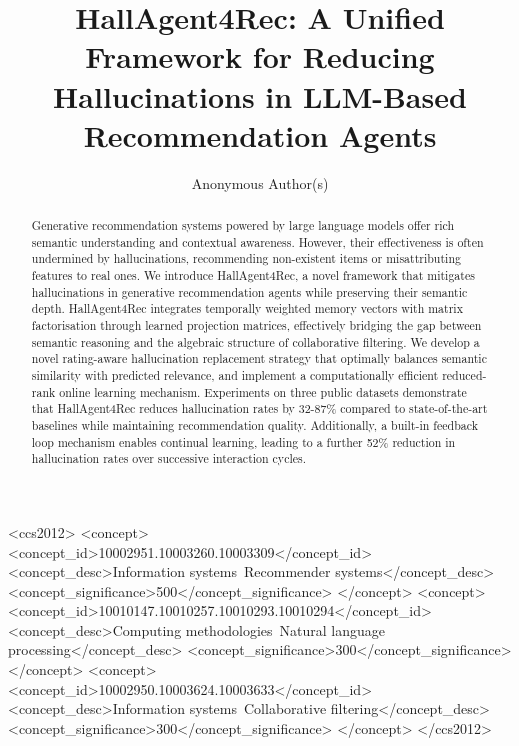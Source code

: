 \documentclass[acmsmall]{acmart}
\title{HallAgent4Rec: A Unified Framework for Reducing Hallucinations in LLM-Based Recommendation Agents}
\author{Anonymous Author(s)}
\begin{document}
\begin{abstract}
Generative recommendation systems powered by large language models offer rich semantic understanding and contextual awareness. However, their effectiveness is often undermined by hallucinations, recommending non-existent items or misattributing features to real ones. %
We introduce HallAgent4Rec, a novel framework that mitigates hallucinations in generative recommendation agents while preserving their semantic depth. HallAgent4Rec integrates temporally weighted memory vectors with matrix factorisation through learned projection matrices, effectively bridging the gap between semantic reasoning and the algebraic structure of collaborative filtering. We develop a novel rating-aware hallucination replacement strategy that optimally balances semantic similarity with predicted relevance, and implement a computationally efficient reduced-rank online learning mechanism. Experiments on three public datasets demonstrate that HallAgent4Rec reduces hallucination rates by 32-87\% compared to state-of-the-art baselines while maintaining recommendation quality. Additionally, a built-in feedback loop mechanism enables continual learning, leading to a further 52\% reduction in hallucination rates over successive interaction cycles. %
 \end{abstract}
\maketitle
\begin{CCSXML}
<ccs2012>
<concept>
<concept_id>10002951.10003260.10003309</concept_id>
<concept_desc>Information systems~Recommender systems</concept_desc>
<concept_significance>500</concept_significance>
</concept>
<concept>
<concept_id>10010147.10010257.10010293.10010294</concept_id>
<concept_desc>Computing methodologies~Natural language processing</concept_desc>
<concept_significance>300</concept_significance>
</concept>
<concept>
<concept_id>10002950.10003624.10003633</concept_id>
<concept_desc>Information systems~Collaborative filtering</concept_desc>
<concept_significance>300</concept_significance>
</concept>
</ccs2012>
\end{CCSXML}

\end{document}
